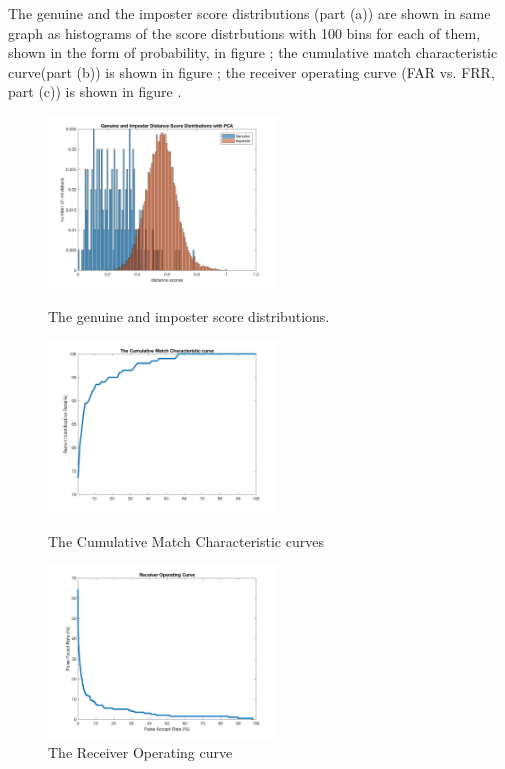 \documentclass[a4paper]{article}
\begin{document}
\begin{spacing}{2.0}
	The genuine and the imposter score distributions (part (a)) are shown in same graph as histograms of the score distrbutions with 100 bins for each of them, shown in the form of probability, in figure ; the cumulative match characteristic curve(part (b)) is shown in figure ; the receiver operating curve (FAR vs. FRR, part (c)) is shown in figure .
	
	\begin{figure}[h]
	\begin{minipage}[t]{0.3\linewidth}
	\centering
	\includegraphics[width = 2.4in]{PCAallscoreDis.jpg}
	\caption{The genuine and imposter score distributions.}
	\label{scoreDispca}
	\end{minipage}
	\begin{minipage}[t]{0.3\linewidth}
	\centering
	\includegraphics[width = 2.4in]{pcaAllCMC.jpg}
	\caption{The Cumulative Match Characteristic curves}
	\label{CMCpca}
	\end{minipage}
	\begin{minipage}[t]{0.3\linewidth}
	\centering
	\includegraphics[width = 2.4in]{pcaAllROC.jpg}
	\caption{The Receiver Operating curve}
	\label{ROCpca}
	\end{minipage}
	\end{figure}


\end{spacing}
\end{document}
